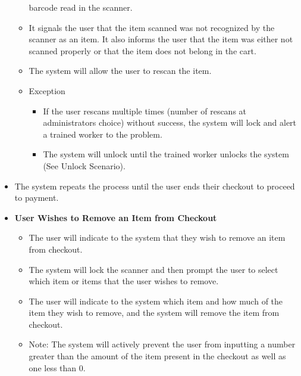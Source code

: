 \begin{itemize}
\begin{itemize}
        barcode read in the scanner. 
        \item It signals the user that the item scanned was not recognized by 
        the scanner as an item. It also informs the user that the item was 
        either not scanned properly or that the item does not belong 
        in the cart.
        \item The system will allow the user to rescan the item.
        \item Exception
        \begin{itemize}
            \item If the user rescans multiple times (number of rescans at 
            administrators choice) without success, the system will 
            lock and alert a trained worker to the problem.
            \item The system will unlock until the trained worker 
            unlocks the system (See Unlock Scenario).
        \end{itemize}
    \end{itemize}
    \item The system repeats the process until the user ends their 
    checkout to proceed to payment. 
    \item \textbf{User Wishes to Remove an Item from Checkout}
    \begin{itemize}
        \item The user will indicate to the system that they wish to 
        remove an item from checkout.
        \item The system will lock the scanner and then prompt the user to 
        select which item or items that the user wishes to remove.
        \item The user will indicate to the system which item and how much of 
        the item they wish to remove, and the system will remove the item 
        from checkout.
        \item Note: The system will actively prevent the user from inputting a 
        number greater than the amount of the item present in the checkout as 
        well as one less than 0.
        

\end{itemize}
\end{itemize}

